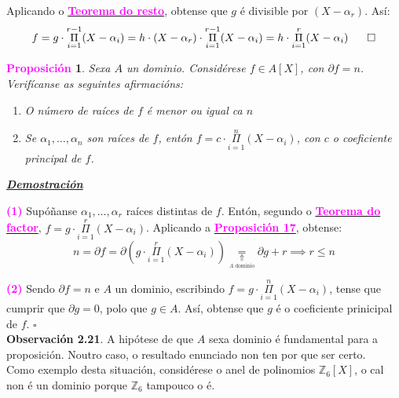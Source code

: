 \documentclass[twoside]{report}
\newcommand{\magbf}[1]{\textcolor{magenta}{\textbf{#1}}} %
\theoremstyle{mystyle}
\newtheorem{prop}{\magbf{Proposición}}[chapter]
\newenvironment{proposition}
{\begin{mdframed}[linecolor = magenta,backgroundcolor = classicrose, linewidth = 2mm]\begin{prop}}
{\end{prop}\end{mdframed}}
\begin{document}
\noindent Aplicando o \hyperref[th2.10]{\magbf{Teorema do resto}}, obtense que $g$ é divisible por $(X - \alpha_{r})$. Así:
$$f = g \cdot \overset{r-1}{\underset{i = 1}{\Pi}}(X-\alpha_{i}) = h \cdot (X - \alpha_{r}) \cdot \overset{r-1}{\underset{i = 1}{\Pi}}(X-\alpha_{i}) = h \cdot \overset{r}{\underset{i = 1}{\Pi}}(X-\alpha_{i}) \hspace{6mm} \square$$

\begin{proposition} \label{prop2.21}
Sexa $A$ un dominio. Considérese $f \in A[X]$, con $\partial f = n$. Verifícanse as seguintes afirmacións:
\begin{enumerate}
    \item O número de raíces de $f$ é menor ou igual ca $n$
    \item Se $\alpha_{1}, \ldots, \alpha_{n}$ son raíces de $f$, entón $f = c \cdot \overset{n}{\underset{i = 1}{\Pi}}(X - \alpha_{i})$, con $c$ o coeficiente principal de $f$.
\end{enumerate}
\end{proposition}

\pagebreak

\noindent \textbf{\textit{\underline{Demostración}}}

\vspace{2mm}

\noindent \magbf{(1)} Supóñanse $\alpha_{1}, \ldots, \alpha_{r}$ raíces distintas de $f$. Entón, segundo o \hyperref[cor2.6]{\magbf{Teorema do factor}}, $f = g \cdot \overset{r}{\underset{i = 1}{\Pi}}(X-\alpha_{i})$. Aplicando a \hyperref[prop2.17]{\magbf{Proposición 17}}, obtense:
$$n = \partial f = \partial ( g \cdot \overset{r}{\underset{i = 1}{\Pi}}(X-\alpha_{i})) \underset{\underset{A \text{ dominio}}{\Uparrow}}{=} \partial g + r \implies r \leq n$$

\noindent \magbf{(2)} Sendo $\partial f = n$ e $A$ un dominio, escribindo $f = g \cdot \overset{n}{\underset{i = 1}{\Pi}}(X-\alpha_{i})$, tense que cumprir que $\partial g = 0$, polo que $g \in A$. Así, obtense que $g$ é o coeficiente prinicipal de $f$. $\square$\\

\noindent \textbf{Observación 2.21}. A hipótese de que $A$ sexa dominio é fundamental para a proposición. Noutro caso, o resultado enunciado non ten por que ser certo.\\

\noindent Como exemplo desta situación, considérese o anel de polinomios $\mathbb{Z}_{6}[X]$, o cal non é un dominio porque $\mathbb{Z}_{6}$ tampouco o é.\\
\end{document}
